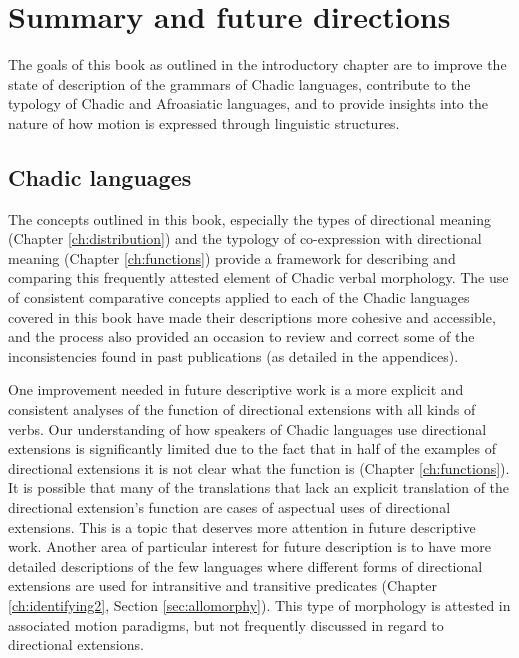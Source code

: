 \chapter{Summary and future directions} \label{ch:summary}

The goals of this book as outlined in the introductory chapter are to improve the state of description of the grammars of Chadic languages, contribute to the typology of Chadic and Afroasiatic languages, and to provide insights into the nature of how motion is expressed through linguistic structures.

\section{Chadic languages}

The concepts outlined in this book, especially the types of directional meaning (Chapter \ref{ch:distribution}) and the typology of co-expression with directional meaning (Chapter \ref{ch:functions}) provide a framework for describing and comparing this frequently attested element of Chadic verbal morphology. The use of consistent comparative concepts applied to each of the Chadic languages covered in this book have made their descriptions more cohesive and accessible, and the process also provided an occasion to review and correct some of the inconsistencies found in past publications (as detailed in the appendices). 

One improvement needed in future descriptive work is a more explicit and consistent analyses of the function of directional extensions with all kinds of verbs. Our understanding of how speakers of Chadic languages use directional extensions is significantly limited due to the fact that in half of the examples of directional extensions it is not clear what the function is (Chapter \ref{ch:functions}). It is possible that many of the translations that lack an explicit translation of the directional extension's function are cases of aspectual uses of directional extensions. This is a topic that deserves more attention in future descriptive work. Another area of particular interest for future description is to have more detailed descriptions of the few languages where different forms of directional extensions are used for intransitive and transitive predicates (Chapter \ref{ch:identifying2}, Section \ref{sec:allomorphy}). This type of morphology is attested in associated motion paradigms, but not frequently discussed in regard to directional extensions.

